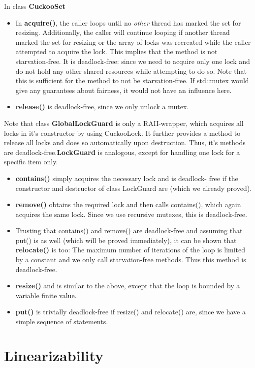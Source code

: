 \documentclass[a4paper,10pt]{article}
\begin{document}
In class \textbf{CuckooSet}
\begin{itemize}
\item In \textbf{acquire()}, the caller loops until no \textit{other} thread has marked the set for resizing. Additionally, the caller will continue looping if another thread marked the set for resizing or the array of locks was recreated while the caller attempted to acquire the lock. This implies that the method is not starvation-free. It is deadlock-free: since we need to acquire only one lock and do not hold any other shared resources while attempting to do so. Note that this is sufficient for the method to not be starvation-free. If std::mutex would  give any guarantees about fairness, it would not have an influence here. 
\item \textbf{release()} is deadlock-free, since we only unlock a mutex.
\end{itemize}
Note that class \textbf{GlobalLockGuard} is only a RAII-wrapper, which acquires all locks in it's constructor by using CuckooLock. It further provides a method to release all locks and does so automatically upon destruction. Thus, it's methods are deadlock-free.\textbf{LockGuard} is analogous, except for handling one lock for a specific item only. 

\begin{itemize}
\item \textbf{contains()} simply acquires the necessary lock and is deadlock- free if the constructor and destructor of class LockGuard are (which we already proved).
\item \textbf{remove()} obtains the required lock and then calls contains(), which again acquires the same lock. Since we use recursive mutexes, this is deadlock-free. 
\item Trusting that contains() and remove() are deadlock-free and assuming that put() is as well (which will be proved immediately), it can be shown that \textbf{relocate()} is too: The maximum number of iterations of the loop is limited by a constant and we only call starvation-free methods. Thus this method is deadlock-free.
\item \textbf{resize()} and is similar to the above, except that the loop is bounded by a variable finite value.
\item \textbf{put()} is trivially deadlock-free if resize() and relocate() are, since we have a simple sequence of statements. 
\end{itemize}

\section{Linearizability}
\label{serc:linearizability}
\end{document}
